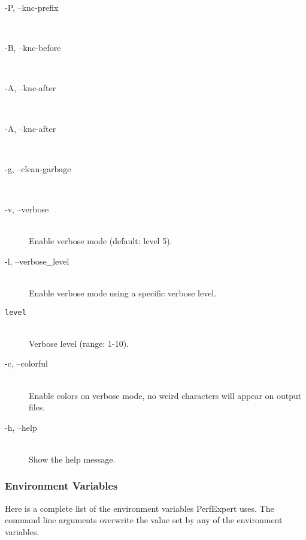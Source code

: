 \begin{description}
	\item[\btt -P, --knc-prefix]\hfill \\

	\item[\btt -B, --knc-before]\hfill \\

	\item[\btt -A, --knc-after]\hfill \\

	\item[\btt -A, --knc-after]\hfill \\

	\item[\btt -g, --clean-garbage]\hfill \\

	\item[\btt -v, --verbose]\hfill \\
	Enable verbose mode (default: level 5).

	\item[\btt -l, --verbose\_level]\hfill \\
	Enable verbose mode using a specific verbose level.

	\item[\tt level]\hfill \\
	Verbose level (range: 1-10).

	\item[\btt -c, --colorful]\hfill \\
	Enable colors on verbose mode, no weird characters will appear on output files.

	\item[\btt -h, --help]\hfill \\
	Show the help message.
\end{description}

\subsubsection{Environment Variables}

Here is a complete list of the environment variables PerfExpert uses. The command line arguments overwrite the value set by any of the environment variables.

